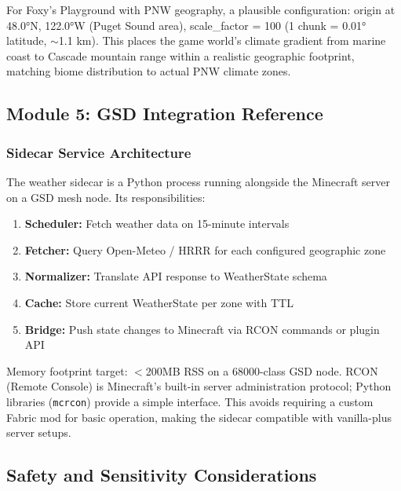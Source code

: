 \documentclass[11pt,letterpaper]{article}
\begin{document}
For Foxy's Playground with PNW geography, a plausible configuration: origin at 48.0°N, 122.0°W (Puget Sound area), scale\_factor = 100 (1 chunk = 0.01° latitude, $\sim$1.1 km). This places the game world's climate gradient from marine coast to Cascade mountain range within a realistic geographic footprint, matching biome distribution to actual PNW climate zones.

\subsection{Module 5: GSD Integration Reference}

\subsubsection{Sidecar Service Architecture}

The weather sidecar is a Python process running alongside the Minecraft server on a GSD mesh node. Its responsibilities:

\begin{enumerate}[noitemsep]
  \item \textbf{Scheduler:} Fetch weather data on 15-minute intervals
  \item \textbf{Fetcher:} Query Open-Meteo / HRRR for each configured geographic zone
  \item \textbf{Normalizer:} Translate API response to WeatherState schema
  \item \textbf{Cache:} Store current WeatherState per zone with TTL
  \item \textbf{Bridge:} Push state changes to Minecraft via RCON commands or plugin API
\end{enumerate}

Memory footprint target: $<$200MB RSS on a 68000-class GSD node. RCON (Remote Console) is Minecraft's built-in server administration protocol; Python libraries (\texttt{mcrcon}) provide a simple interface. This avoids requiring a custom Fabric mod for basic operation, making the sidecar compatible with vanilla-plus server setups.

\subsection{Safety and Sensitivity Considerations}
\end{document}
